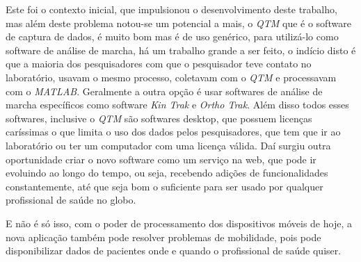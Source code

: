 Este foi o contexto inicial, que impulsionou o desenvolvimento deste trabalho,
mas além deste problema notou-se um potencial a mais, o \emph{QTM} que é o software 
de captura de dados, é muito bom mas é de uso genérico, para utilizá-lo como 
software de análise de marcha, há um trabalho grande a ser feito, o indício disto é 
que a maioria dos pesquisadores com que o pesquisador teve contato no laboratório, 
usavam o mesmo processo, coletavam com o \emph{QTM} e processavam com o \emph{MATLAB}. 
Geralmente a outra opção é usar softwares de análise de marcha específicos como 
software \emph{Kin Trak} e \emph{Ortho Trak}. Além disso todos esses softwares, inclusive o
\emph{QTM} são softwares desktop, que possuem licenças caríssimas o que limita o
uso dos dados pelos pesquisadores, que tem que ir ao laboratório ou ter um computador
com uma licença válida. Daí surgiu outra oportunidade criar o novo software 
como um serviço na web, que pode ir evoluindo ao longo do tempo, ou seja,
recebendo adições de funcionalidades constantemente, até que seja bom o suficiente
para ser usado por qualquer profissional de saúde no globo.

E não é só isso, com o poder de processamento dos dispositivos móveis de hoje, a nova
aplicação também pode resolver problemas de mobilidade, pois pode disponibilizar dados de pacientes
onde e quando o profissional de saúde quiser.



